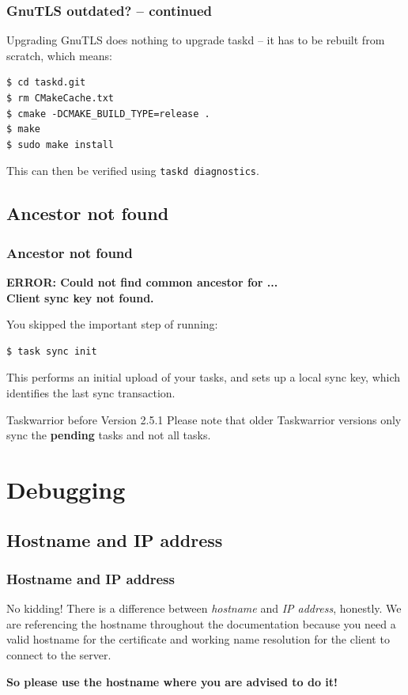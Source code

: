 \documentclass[t,handout]{beamer}
\begin{document}
\begin{frame}[fragile]\frametitle{GnuTLS outdated? -- continued}
    \vfill
    Upgrading GnuTLS does nothing to upgrade taskd -- it has to be rebuilt from scratch, which means:

    \begin{lstlisting}
$ cd taskd.git
$ rm CMakeCache.txt
$ cmake -DCMAKE_BUILD_TYPE=release .
$ make
$ sudo make install\end{lstlisting}

    This can then be verified using \verb+taskd diagnostics+.
\end{frame}

\subsection{Ancestor not found}

\begin{frame}[fragile]\frametitle{Ancestor not found}
    \vfill
    \textbf{ERROR: Could not find common ancestor for ...\\
Client sync key not found.}

    You skipped the important step of running:
    \begin{lstlisting}
$ task sync init\end{lstlisting}

    This performs an initial upload of your tasks, and sets up a local sync key, which identifies the last sync transaction.

    \begin{alertblock}{Taskwarrior before Version 2.5.1}
        Please note that older Taskwarrior versions only sync the \textbf{pending} tasks and not all tasks.
    \end{alertblock}
\end{frame}

\section{Debugging}

\subsection{Hostname and IP address}

\begin{frame}[fragile]\frametitle{Hostname and IP address}
    \vfill
    \begin{alertblock}{No kidding!}
        There is a difference between \textit{hostname} and \textit{IP address}, honestly. We are referencing the hostname throughout the documentation because you need a valid hostname for the certificate and working name resolution for the client to connect to the server.

        \textbf{So please use the hostname where you are advised to do it!}
    \end{alertblock}
\end{frame}
\end{document}
